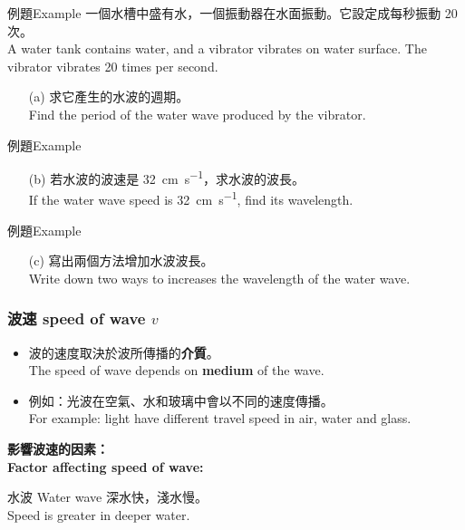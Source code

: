 \documentclass[beamer=true]{standalone}
\begin{document}
\begin{frame}[t]{例題Example}
    一個水槽中盛有水，一個振動器在水面振動。它設定成每秒振動 20 次。\\A water tank contains water, and a vibrator vibrates on water surface. The vibrator vibrates 20 times per second.
    \begin{itemize}
        \item [(a)] 求它產生的水波的週期。\\Find the period of the water wave produced by the vibrator.
    \end{itemize}
\end{frame}

\begin{frame}[t]{例題Example}
    \begin{itemize}
        \item [(b)] 若水波的波速是 \qty{32}{cm.s^{-1}}，求水波的波長。\\If the water wave speed is \qty{32}{cm.s^{-1}}, find its wavelength.
    \end{itemize}
\end{frame}

\begin{frame}[t]{例題Example}
    \begin{itemize}
        \item [(c)] 寫出兩個方法增加水波波長。\\Write down two ways to increases the wavelength of the water wave.
    \end{itemize}
\end{frame}




\begin{frame}
    \frametitle{波速 speed of wave $v$}
    \begin{itemize}
        \item 波的速度取決於波所傳播的\textbf{介質}。\\The speed of wave depends on \textbf{medium} of the wave.
        \item 例如：光波在空氣、水和玻璃中會以不同的速度傳播。\\For example: light have different travel speed in air, water and glass.
    \end{itemize}
    \bigskip \bigskip
    \textbf{影響波速的因素：\\Factor affecting speed of wave:}
    \begin{exampleblock}{水波 Water wave}
        深水快，淺水慢。\\Speed is greater in deeper water.
    \end{exampleblock}

\end{frame}
\end{document}

